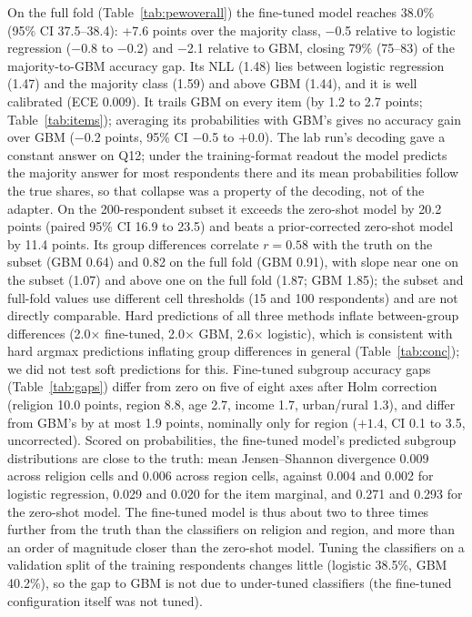 \documentclass[conference]{IEEEtran}
\begin{document}
On the full fold (Table~\ref{tab:pewoverall}) the fine-tuned model reaches 38.0\% (95\% CI 37.5--38.4): +7.6 points over the majority class, $-$0.5 relative to logistic regression ($-$0.8 to $-$0.2) and $-$2.1 relative to GBM, closing 79\% (75--83) of the majority-to-GBM accuracy gap. Its NLL (1.48) lies between logistic regression (1.47) and the majority class (1.59) and above GBM (1.44), and it is well calibrated (ECE 0.009). It trails GBM on every item (by 1.2 to 2.7 points; Table~\ref{tab:items}); averaging its probabilities with GBM's gives no accuracy gain over GBM ($-$0.2 points, 95\% CI $-$0.5 to $+$0.0). The lab run's decoding gave a constant answer on Q12; under the training-format readout the model predicts the majority answer for most respondents there and its mean probabilities follow the true shares, so that collapse was a property of the decoding, not of the adapter. On the 200-respondent subset it exceeds the zero-shot model by 20.2 points (paired 95\% CI 16.9 to 23.5) and beats a prior-corrected zero-shot model by 11.4 points. Its group differences correlate $r={0.58}$ with the truth on the subset (GBM 0.64) and 0.82 on the full fold (GBM 0.91), with slope near one on the subset (1.07) and above one on the full fold (1.87; GBM 1.85); the subset and full-fold values use different cell thresholds (15 and 100 respondents) and are not directly comparable. Hard predictions of all three methods inflate between-group differences (2.0$\times$ fine-tuned, 2.0$\times$ GBM, 2.6$\times$ logistic), which is consistent with hard argmax predictions inflating group differences in general (Table~\ref{tab:conc}); we did not test soft predictions for this. Fine-tuned subgroup accuracy gaps (Table~\ref{tab:gaps}) differ from zero on five of eight axes after Holm correction (religion 10.0 points, region 8.8, age 2.7, income 1.7, urban/rural 1.3), and differ from GBM's by at most 1.9 points, nominally only for region ($+1.4$, CI 0.1 to 3.5, uncorrected). Scored on probabilities, the fine-tuned model's predicted subgroup distributions are close to the truth: mean Jensen--Shannon divergence 0.009 across religion cells and 0.006 across region cells, against 0.004 and 0.002 for logistic regression, 0.029 and 0.020 for the item marginal, and 0.271 and 0.293 for the zero-shot model. The fine-tuned model is thus about two to three times further from the truth than the classifiers on religion and region, and more than an order of magnitude closer than the zero-shot model. Tuning the classifiers on a validation split of the training respondents changes little (logistic 38.5\%, GBM 40.2\%), so the gap to GBM is not due to under-tuned classifiers (the fine-tuned configuration itself was not tuned).
\end{document}
